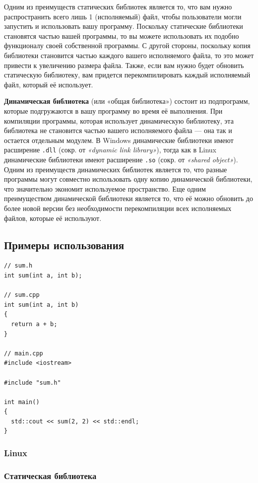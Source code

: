 Одним из преимуществ статических библиотек является то, что вам нужно распространить всего лишь 1 (исполняемый) файл, чтобы пользователи могли запустить и использовать вашу программу. Поскольку статические библиотеки становятся частью вашей программы, то вы можете использовать их подобно функционалу своей собственной программы. С другой стороны, поскольку копия библиотеки становится частью каждого вашего исполняемого файла, то это может привести к увеличению размера файла. Также, если вам нужно будет обновить статическую библиотеку, вам придется перекомпилировать каждый исполняемый файл, который её использует.

\textbf{Динамическая библиотека} (или «общая библиотека») состоит из подпрограмм, которые подгружаются в вашу программу во время её выполнения. При компиляции программы, которая использует динамическую библиотеку, эта библиотека не становится частью вашего исполняемого файла — она ​​так и остается отдельным модулем. В Windows динамические библиотеки имеют расширение \texttt{.dll} (сокр. от \textit{«dynamic link library»}), тогда как в Linux динамические библиотеки имеют расширение \texttt{.so} (сокр. от \textit{«shared object»}). Одним из преимуществ динамических библиотек является то, что разные программы могут совместно использовать одну копию динамической библиотеки, что значительно экономит используемое пространство. Еще одним преимуществом динамической библиотеки является то, что её можно обновить ​​до более новой версии без необходимости перекомпиляции всех исполняемых файлов, которые её используют.

\subsection{Примеры использования}

\begin{verbatim}
// sum.h
int sum(int a, int b);

// sum.cpp
int sum(int a, int b)
{
  return a + b;
}

// main.cpp
#include <iostream>

#include "sum.h"

int main()
{
  std::cout << sum(2, 2) << std::endl;
}
\end{verbatim}

\subsubsection{Linux}

\subsubsection*{Статическая библиотека}

